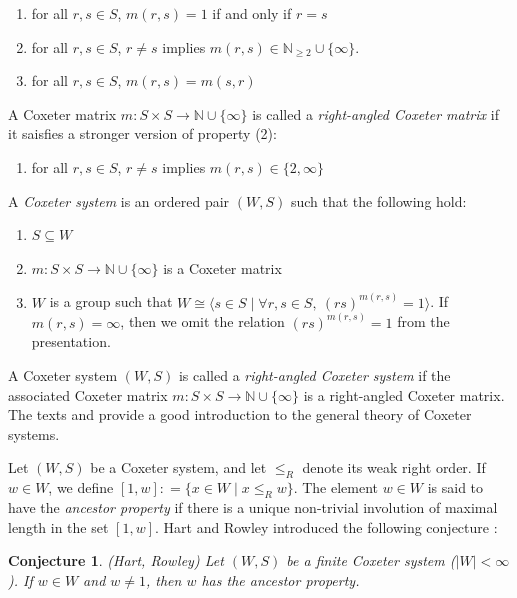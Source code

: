 \documentclass{amsart}
\theoremstyle{plain} %
\newtheorem{conject}[thm]{Conjecture}
\theoremstyle{definition}
\def\weakr{\leq_{R}}
\def\N{\mathbb{N}}
\begin{document}
\begin{enumerate}
    \item for all $ r,s\in S$, $ m(r,s) =1$ if and only if $ r=s$

    \item for all $ r,s\in S$, $ r \neq s$ implies $ m(r,s) \in \N_{\geq 2} \cup \{ \infty \}$.

    \item for all $ r,s\in S$, $ m(r,s) = m(s,r)$ 
\end{enumerate}
A Coxeter matrix $ m: S \times S \rightarrow \N \cup \{ \infty \}$ is called a \emph{right-angled Coxeter matrix} if it saisfies a stronger version of property (2):

\begin{enumerate}
    \item[($2^{\ast}$)] for all $ r,s \in S$, $ r\neq s$ implies $m(r,s) \in \{ 2, \infty  \}$ 
\end{enumerate}
A \emph{Coxeter system} is an ordered pair $ (W,S)$ such that the following hold:
\begin{enumerate}
    \item $ S \subseteq W$

    \item $ m : S \times S \rightarrow \N \cup \{ \infty \}$ is a Coxeter matrix

    \item $ W $ is a group such that $ W \cong  \langle s\in S \mid \forall r,s\in S, \ (rs)^{m(r,s)} =1 \rangle$. If $ m(r,s) = \infty$, then we omit the relation $ (rs)^{m(r,s)} = 1$ from the presentation.
\end{enumerate}
A Coxeter system $ (W,S)$ is called a \emph{right-angled Coxeter system} if the associated Coxeter matrix $ m : S \times S \rightarrow \N \cup \{ \infty \}$ is a right-angled Coxeter matrix. The texts \cite{humphreys1992reflection} and \cite{bjorner2005combinatorics} provide a good introduction to the general theory of Coxeter systems.

Let $ (W,S)$ be a Coxeter system, and let $ \weakr $ denote its weak right order. If $ w\in W$, we define $ [1,w] : = \{ x\in W \mid x \weakr w \}$. The element $ w\in W$ is said to have the \emph{ancestor property} if there is a unique non-trivial involution of maximal length in the set $ [1,w]$. Hart and Rowley introduced the following conjecture \cite{hart2025noteinvolutionprefixescoxeter}:

\begin{conject}{(Hart, Rowley)}
    Let $ (W,S)$ be a finite Coxeter system ($|W|< \infty$). If $ w \in W$ and $ w\neq 1$, then $w$ has the ancestor property.
\end{conject}
\end{document}
